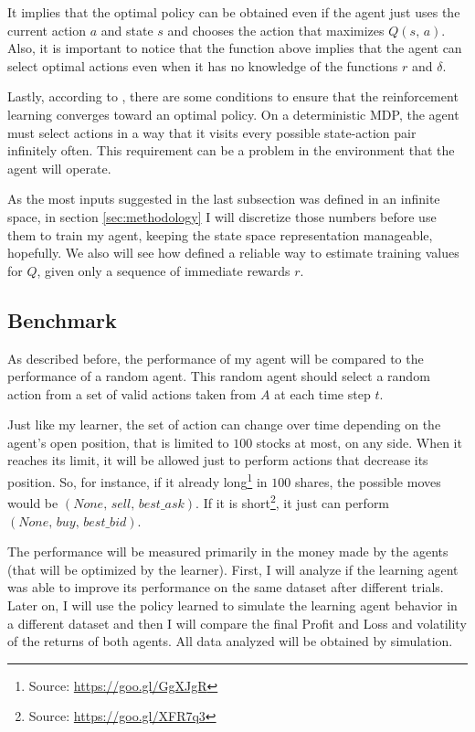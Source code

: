 \documentclass[a4paper]{article}
\begin{document}
It implies that the optimal policy can be obtained even if the agent just uses the current action $a$ and state $s$ and chooses the action that maximizes $Q(s,\, a)$. Also, it is important to notice that the function above implies that the agent can select optimal actions even when it has no knowledge of the functions $r$ and $\delta$.

Lastly, according to \cite{Mitchell}, there are some conditions to ensure that the reinforcement learning converges toward an optimal policy. On a deterministic MDP, the agent must select actions in a way that it visits every possible state-action pair infinitely often. This requirement can be a problem in the environment that the agent will operate.

As the most inputs suggested in the last subsection was defined in an infinite space, in section \ref{sec:methodology} I will discretize those numbers before use them to train my agent, keeping the state space representation manageable, hopefully. We also will see how \cite{Mitchell} defined a reliable way to estimate training values for $Q$, given only a sequence of immediate rewards $r$.

\subsection{Benchmark}
As described before, the performance of my agent will be compared to the performance of a random agent. This random agent should select a random action from a set of valid actions taken from $A$ at each time step $t$.

Just like my learner, the set of action can change over time depending on the agent's open position, that is limited to $100$ stocks at most, on any side. When it reaches its limit, it will be allowed just to perform actions that decrease its position. So, for instance, if it already long\footnote{Source: \url{https://goo.gl/GgXJgR}} in $100$ shares, the possible moves would be $\left (None,\, sell,\, best\_ask \right)$. If it is short\footnote{Source: \url{https://goo.gl/XFR7q3}}, it just can perform $\left (None,\, buy,\, best\_bid\right)$.

The performance will be measured primarily in the money made by the agents (that will be optimized by the learner). First, I will analyze if the learning agent was able to improve its performance on the same dataset after different trials. Later on, I will use the policy learned to simulate the learning agent behavior in a different dataset and then I will compare the final Profit and Loss and volatility of the returns of both agents. All data analyzed will be obtained by simulation.
\end{document}
